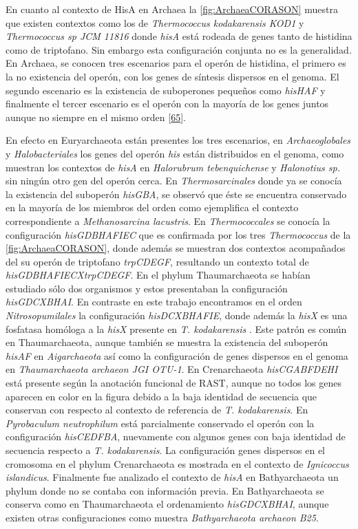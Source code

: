 \documentclass[12pt,twoside]{reedthesis}
\begin{document}
  En cuanto al contexto de HisA en Archaea la \autoref{fig:ArchaeaCORASON}
  muestra que existen contextos como los de \emph{Thermococcus
  kodakarensis KOD1} y \emph{Thermococcus sp JCM 11816} donde \emph{hisA}
  está rodeada de genes tanto de histidina como de triptofano. Sin embargo
  esta configuración conjunta no es la generalidad. En Archaea, se conocen
  tres escenarios para el operón de histidina, el primero es la no
  existencia del operón, con los genes de síntesis dispersos en el genoma.
  El segundo escenario es la existencia de suboperones pequeños como
  \emph{hisHAF} y finalmente el tercer escenario es el operón con la
  mayoría de los genes juntos aunque no siempre en el mismo orden
  {[}\protect\hyperlink{ref-fondi_evolution_2009}{65}{]}.
  
  En efecto en Euryarchaeota están presentes los tres escenarios, en
  \emph{Archaeoglobales} y \emph{Halobacteriales} los genes del operón
  \emph{his} están distribuidos en el genoma, como muestran los contextos
  de \emph{hisA} en \emph{Halorubrum tebenquichense} y \emph{Halonotius
  sp.} sin ningún otro gen del operón cerca. En \emph{Thermosarcinales}
  donde ya se conocía la existencia del suboperón \emph{hisGBA}, se
  observó que éste se encuentra conservado en la mayoría de los miembros
  del orden como ejemplifica el contexto correspondiente a
  \emph{Methanosarcina lacustris}. En \emph{Thermococcales} se conocía la
  configuración \emph{hisGDBHAFIEC} que es confirmada por los tres
  \emph{Thermococcus} de la \autoref{fig:ArchaeaCORASON}, donde además se
  muestran dos contextos acompañados del su operón de triptofano
  \emph{trpCDEGF}, resultando un contexto total de
  \emph{hisGDBHAFIECXtrpCDEGF}. En el phylum Thaumarchaeota se habían
  estudiado sólo dos organismos y estos presentaban la configuración
  \emph{hisGDCXBHAI}. En contraste en este trabajo encontramos en el orden
  \emph{Nitrosopumilales} la configuración \emph{hisDCXBHAFIE}, donde
  además la \emph{hisX} es una fosfatasa homóloga a la \emph{hisX}
  presente en \emph{T. kodakarensis} . Este patrón es común en
  Thaumarchaeota, aunque también se muestra la existencia del suboperón
  \emph{hisAF} en \emph{Aigarchaeota} así como la configuración de genes
  dispersos en el genoma en \emph{Thaumarchaeota archaeon JGI OTU-1}. En
  Crenarchaeota \emph{hisCGABFDEHI} está presente según la anotación
  funcional de RAST, aunque no todos los genes aparecen en color en la
  figura debido a la baja identidad de secuencia que conservan con
  respecto al contexto de referencia de \emph{T. kodakarensis}. En
  \emph{Pyrobaculum neutrophilum} está parcialmente conservado el operón
  con la configuración \emph{hisCEDFBA}, nuevamente con algunos genes con
  baja identidad de secuencia respecto a \emph{T. kodakarensis}. La
  configuración genes dispersos en el cromosoma en el phylum Crenarchaeota
  es mostrada en el contexto de \emph{Ignicoccus islandicus}. Finalmente
  fue analizado el contexto de \emph{hisA} en Bathyarchaeota un phylum
  donde no se contaba con información previa. En Bathyarchaeota se
  conserva como en Thaumarchaeota el ordenamiento \emph{hisGDCXBHAI},
  aunque existen otras configuraciones como muestra \emph{Bathyarchaeota
  archaeon B25}.
  
\end{document}
